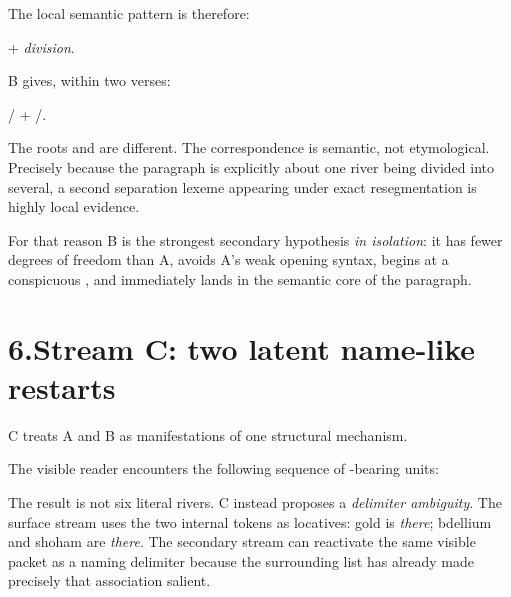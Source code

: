 The local semantic pattern is therefore:

\begin{center}
 \quad + \quad \textit{division}.
\end{center}

B gives, within two verses:

\begin{center}
/ \quad + \quad {}/.
\end{center}

The roots  and  are different.  The correspondence is semantic, not etymological.  Precisely because the paragraph is explicitly about one river being divided into several, a second separation lexeme appearing under exact resegmentation is highly local evidence.

For that reason B is the strongest secondary hypothesis \emph{in isolation}: it has fewer degrees of freedom than A, avoids A's weak opening syntax, begins at a conspicuous , and immediately lands in the semantic core of the paragraph.

\section*{6.\quad Stream C: two latent name-like restarts}

C treats A and B as manifestations of one structural mechanism.

The visible reader encounters the following sequence of -bearing units:


The result is not six literal rivers.  C instead proposes a \emph{delimiter ambiguity}.  The surface stream uses the two internal  tokens as locatives: gold is \emph{there}; bdellium and shoham are \emph{there}.  The secondary stream can reactivate the same visible packet as a naming delimiter because the surrounding list has already made precisely that association salient.

